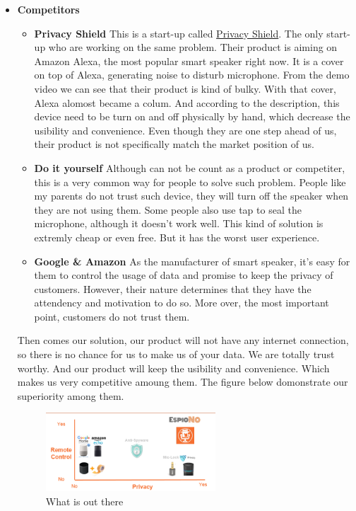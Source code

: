\documentclass[12pt,twoside]{article}
\begin{document}
\begin{itemize}
\item \textbf{Competitors}\\
\begin{itemize}
    \item \textbf{Privacy Shield} This is a start-up called \href{https://getprivacyshield.co/}{Privacy Shield}. The only start-up who are working on the same problem.
    Their product is aiming on Amazon Alexa, the most popular smart speaker right now. It is a cover on top of Alexa, generating noise to disturb microphone. From the 
    demo video we can see that their product is kind of bulky. With that cover, Alexa alomost became a colum. And according to the description, this device need to be 
    turn on and off physically by hand, which decrease the usibility and convenience. Even though they are one step ahead of us, their product is not specifically match 
    the market position of us.
    \item \textbf{Do it yourself} Although can not be count as a product or competiter, this is a very common way for people to solve such problem. People like my parents
    do not trust such device, they will turn off the speaker when they are not using them. Some people also use tap to seal the microphone, although it doesn't work well.
    This kind of solution is extremly cheap or even free. But it has the worst user experience.
    \item \textbf{Google \& Amazon} As the manufacturer of smart speaker, it's easy for them to control the usage of data and promise to keep the privacy of customers. 
    However, their nature determines that they have the attendency and motivation to do so. More over, the most important point, customers do not trust them.
\end{itemize}
Then comes our solution, our product will not have any internet connection, so there is no chance for us to make us of your data. We are totally trust worthy. And our 
product will keep the usibility and convenience. Which makes us very competitive amoung them. The figure below domonstrate our superiority among them.

\begin{figure}[!htb]
\centering
\includegraphics[width=0.6\textwidth]{whatsoutthere.png}
\caption{What is out there}
\label{fig:What is out there}
\end{figure}

\end{itemize}
\end{document}

